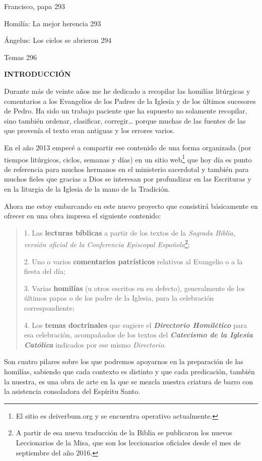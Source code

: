 \documentclass[]{article}
\begin{document}
Francisco, papa 293

Homilía: La mejor herencia 293

Ángelus: Los cielos se abrieron 294

Temas 296

\textbf{INTRODUCCIÓN}

Durante más de veinte años me he dedicado a recopilar las homilías
litúrgicas y comentarios a los Evangelios de los Padres de la Iglesia y
de los últimos sucesores de Pedro. Ha sido un trabajo paciente que ha
supuesto no solamente recopilar, sino también ordenar, clasificar,
corregir\ldots{} porque muchas de las fuentes de las que provenía el
texto eran antiguas y los errores varios.

En el año 2013 empecé a compartir ese contenido de una forma organizada
(por tiempos litúrgicos, ciclos, semanas y días) en un sitio
web\footnote{El sitio es deiverbum.org y se encuentra operativo
  actualmente.} que hoy día es punto de referencia para muchos hermanos
en el ministerio sacerdotal y también para muchos fieles que gracias a
Dios se interesan por profundizar en las Escrituras y en la liturgia de
la Iglesia de la mano de la Tradición.

Ahora me estoy embarcando en este nuevo proyecto que consistirá
básicamente en ofrecer en una obra impresa el siguiente contenido:

\begin{quote}
1. Las \textbf{lecturas bíblicas} a partir de los textos de la
\emph{Sagrada Biblia, versión oficial de la Conferencia Episcopal
Española}\footnote{A partir de esa nueva traducción de la Biblia se
  publicaron los nuevos Leccionarios de la Misa, que son los
  leccionarios oficiales desde el mes de septiembre del año 2016.};

2. Uno o varios \textbf{comentarios patrísticos} relativos al Evangelio
o a la fiesta del día;

3. Varias \textbf{homilías} (u otros escritos en su defecto),
generalmente de los últimos papas o de los padre de la Iglesia, para la
celebración correspondiente;

4. Los \textbf{temas doctrinales} que sugiere el
\emph{\textbf{Directorio Homilético}} para esa celebración, acompañados
de los textos del \emph{\textbf{Catecismo de la Iglesia Católica}}
indicados por ese mismo \emph{Directorio}.
\end{quote}

Son cuatro pilares sobre los que podremos apoyarnos en la preparación de
las homilías, sabiendo que cada contexto es distinto y que cada
predicación, también la nuestra, es una obra de arte en la que se mezcla
nuestra criatura de barro con la asistencia consoladora del Espíritu
Santo.
\end{document}
